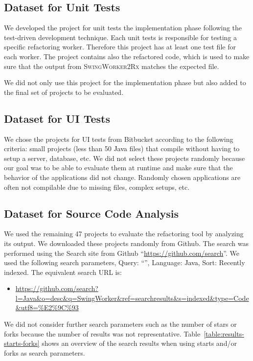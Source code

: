\documentclass[type=bsc,accentcolor=tud9c]{tudthesis}
\newcommand{\framework}[1]{\textcolor{black}{#1}}
\newcommand{\toolextension}{\textsc{SwingWorker2Rx}}
\begin{document}
\subsection{Dataset for Unit Tests}
We developed the project for unit tests the implementation phase following the test-driven development technique. Each unit tests is responsible for testing a specific refactoring worker. Therefore this project has at least one test file for each worker. The project contains also the refactored code, which is used to make sure that the output from \toolextension{} matches the expected file.

We did not only use this project for the implementation phase but also added to the final set of projects to be evaluated.

\subsection{Dataset for UI Tests}
We chose the projects for UI tests from Bitbucket according to the following criteria: small projects (less than 50 \framework{Java} files) that compile without having to setup a server, database, etc. We did not select these projects randomly because our goal was to be able to evaluate them at runtime and make sure that the behavior of the applications did not change. Randomly chosen applications are often not compilable due to missing files, complex setups, etc.

\subsection{Dataset for Source Code Analysis}
We used the remaining 47 projects to evaluate the refactoring tool by analyzing its output. We downloaded these projects randomly from Github. The search was performed using the Search site from Github ``\url{https://github.com/search}''. We used the following search parameters, Query: ``'', Language: \framework{Java}, Sort: Recently indexed. The equivalent search URL is: 
\begin{itemize}
	\item \url{https://github.com/search?l=Java&o=desc&q=SwingWorker&ref=searchresults&s=indexed&type=Code&utf8=\%E2\%9C\%93}
\end{itemize}

We did not consider further search parameters such as the number of stars or forks because the number of results was not representative. Table~\ref{table:results-starts-forks} shows an overview of the search results when using starts and/or forks as search parameters.
\end{document}
